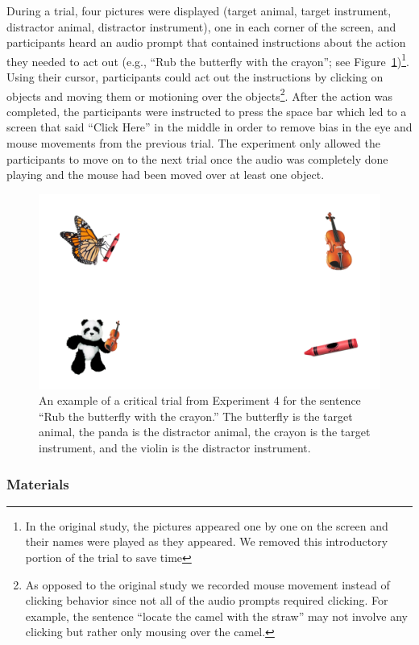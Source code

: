 \documentclass[
  man,floatsintext]{apa6}
\begin{document}
During a trial, four pictures were displayed (target animal, target
instrument, distractor animal, distractor instrument), one in each
corner of the screen, and participants heard an audio prompt that
contained instructions about the action they needed to act out (e.g.,
``Rub the butterfly with the crayon''; see Figure~\ref{fig:E4-example-trial})\footnote{In the original study, the pictures appeared one by one on the
  screen and their names were played as they appeared. We removed this
  introductory portion of the trial to save time}. Using their
cursor, participants could act out the instructions by clicking on
objects and moving them or motioning over the objects\footnote{As opposed to the original study we recorded mouse movement
  instead of clicking behavior since not all of the audio prompts
  required clicking. For example, the sentence ``locate the camel with
  the straw'' may not involve any clicking but rather only mousing over
  the camel.}. After the
action was completed, the participants were instructed to press the
space bar which led to a screen that said ``Click Here'' in the middle in
order to remove bias in the eye and mouse movements from the previous
trial. The experiment only allowed the participants to move on to the
next trial once the audio was completely done playing and the mouse had
been moved over at least one object.

\begin{figure}
\includegraphics[width=4.5in]{group-d/E4-example-figure} \caption{An example of a critical trial from Experiment 4 for the sentence “Rub the butterfly with the crayon.” The butterfly is the target animal, the panda is the distractor animal, the crayon is the target instrument, and the violin is the distractor instrument.}\label{fig:E4-example-trial}
\end{figure}

\hypertarget{materials-1}{%
\subsubsection{Materials}\label{materials-1}}
\end{document}
